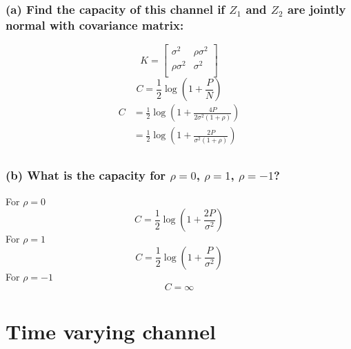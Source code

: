 \documentclass[11pt, oneside]{book}   	%
\begin{document}
\subsubsection{(a) Find the capacity of this channel if $Z_1$ and $Z_2$ are jointly normal with covariance matrix:}
\[
K=
	\begin{bmatrix}
		\sigma^2 & \rho\sigma^2 \\
		\rho\sigma^2 & \sigma^2 \\
	\end{bmatrix}
\]
$$C = \frac{1}{2}\log{(1+\frac{P}{N})}$$
\begin{equation}
\begin{split}
C & = \frac{1}{2}\log(1+\frac{4P}{2\sigma^2(1+\rho)})\\
& = \frac{1}{2}\log(1+\frac{2P}{\sigma^2(1+\rho)})\\
\end{split}
\end{equation}

\subsubsection{(b) What is the capacity for $\rho=0$, $\rho=1$, $\rho=-1$?}
For $\rho = 0$
$$C = \frac{1}{2}\log(1+\frac{2P}{\sigma^2})$$
For $\rho = 1$
$$C = \frac{1}{2}\log{(1+\frac{P}{\sigma^2})}$$
For $\rho = -1$
$$C = \infty$$

\section{Time varying channel}
\end{document}
